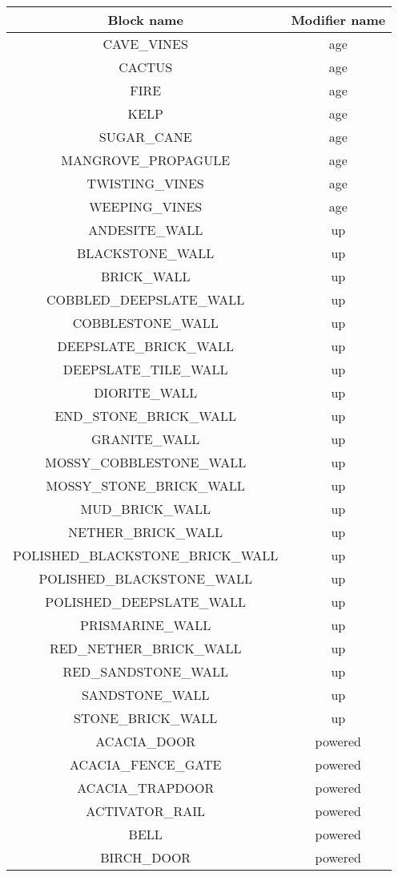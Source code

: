 \begin{longtable}{ |c|c| }
	\hline
	Block name & Modifier name \\
	\hline
	\endhead
	CAVE\_VINES & age \\
	CACTUS & age \\
	FIRE & age \\
	KELP & age \\
	SUGAR\_CANE & age \\
	MANGROVE\_PROPAGULE & age \\
	TWISTING\_VINES & age \\
	WEEPING\_VINES & age \\
	\hline
	ANDESITE\_WALL & up \\
	BLACKSTONE\_WALL & up \\
	BRICK\_WALL & up \\
	COBBLED\_DEEPSLATE\_WALL & up \\
	COBBLESTONE\_WALL & up \\
	DEEPSLATE\_BRICK\_WALL & up \\
	DEEPSLATE\_TILE\_WALL & up \\
	DIORITE\_WALL & up \\
	END\_STONE\_BRICK\_WALL & up \\
	GRANITE\_WALL & up \\
	MOSSY\_COBBLESTONE\_WALL & up \\
	MOSSY\_STONE\_BRICK\_WALL & up \\
	MUD\_BRICK\_WALL & up \\
	NETHER\_BRICK\_WALL & up \\
	POLISHED\_BLACKSTONE\_BRICK\_WALL & up \\
	POLISHED\_BLACKSTONE\_WALL & up \\
	POLISHED\_DEEPSLATE\_WALL & up \\
	PRISMARINE\_WALL & up \\
	RED\_NETHER\_BRICK\_WALL & up \\
	RED\_SANDSTONE\_WALL & up \\
	SANDSTONE\_WALL & up \\
	STONE\_BRICK\_WALL & up \\
	\hline
	ACACIA\_DOOR & powered \\
	ACACIA\_FENCE\_GATE & powered \\
	ACACIA\_TRAPDOOR & powered \\
	ACTIVATOR\_RAIL & powered \\
	BELL & powered \\
	BIRCH\_DOOR & powered \\

\end{longtable}
